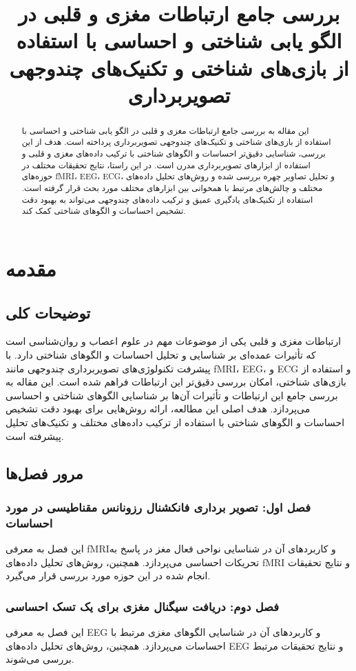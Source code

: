 \documentclass[12pt]{article}
\title{بررسی جامع ارتباطات مغزی و قلبی در الگو یابی شناختی و احساسی با استفاده از بازی‌های شناختی و تکنیک‌های چندوجهی تصویربرداری}
\author[1]{\fontsize{9pt}{11pt}\selectfont \lr{Ali Ebrahimian Chermahini}}
\affil[1]{\fontsize{9pt}{11pt}\selectfont \lr{Department of Biomedical Engineering, Shahrekord Branch, Islamic Azad University, Shahrekord, Iran}}
\date{}
\begin{document}
\maketitle

\begin{abstract}
این مقاله به بررسی جامع ارتباطات مغزی و قلبی در الگو یابی شناختی و احساسی با استفاده از بازی‌های شناختی و تکنیک‌های چندوجهی تصویربرداری پرداخته است. هدف از این بررسی، شناسایی دقیق‌تر احساسات و الگوهای شناختی با ترکیب داده‌های مغزی و قلبی و استفاده از ابزارهای تصویربرداری مدرن است. در این راستا، نتایج تحقیقات مختلف در حوزه‌های fMRI، EEG، ECG، و تحلیل تصاویر چهره بررسی شده و روش‌های تحلیل داده‌های مختلف و چالش‌های مرتبط با همخوانی بین ابزارهای مختلف مورد بحث قرار گرفته است. استفاده از تکنیک‌های یادگیری عمیق و ترکیب داده‌های چندوجهی می‌تواند به بهبود دقت تشخیص احساسات و الگوهای شناختی کمک کند.
\end{abstract}

\section*{مقدمه}
\subsection{توضیحات کلی}
ارتباطات مغزی و قلبی یکی از موضوعات مهم در علوم اعصاب و روان‌شناسی است که تأثیرات عمده‌ای بر شناسایی و تحلیل احساسات و الگوهای شناختی دارد. با پیشرفت تکنولوژی‌های تصویربرداری چندوجهی مانند fMRI، EEG، و ECG و استفاده از بازی‌های شناختی، امکان بررسی دقیق‌تر این ارتباطات فراهم شده است. این مقاله به بررسی جامع این ارتباطات و تأثیرات آن‌ها بر شناسایی الگوهای شناختی و احساسی می‌پردازد. هدف اصلی این مطالعه، ارائه روش‌هایی برای بهبود دقت تشخیص احساسات و الگوهای شناختی با استفاده از ترکیب داده‌های مختلف و تکنیک‌های تحلیل پیشرفته است.

\subsection{مرور فصل‌ها}
\subsubsection{فصل اول: تصویر برداری فانکشنال رزونانس مقناطیسی در مورد احساسات}
این فصل به معرفی fMRIو کاربردهای آن در شناسایی نواحی فعال مغز در پاسخ به تحریکات احساسی می‌پردازد. همچنین، روش‌های تحلیل داده‌های fMRI و نتایج تحقیقات انجام شده در این حوزه مورد بررسی قرار می‌گیرد.
\subsubsection{فصل دوم: دریافت سیگنال مغزی برای یک تسک احساسی}
این فصل به معرفی EEG و کاربردهای آن در شناسایی الگوهای مغزی مرتبط با احساسات می‌پردازد. همچنین، روش‌های تحلیل داده‌های EEG و نتایج تحقیقات مرتبط بررسی می‌شوند.
\end{document}
